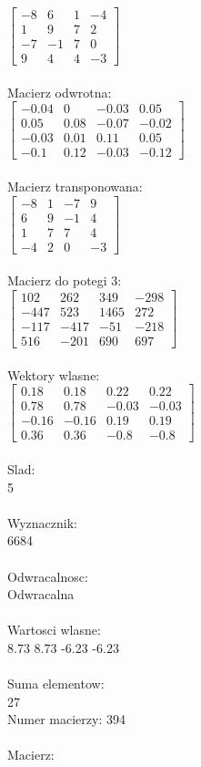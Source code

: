 \documentclass[a4paper,12pt]{article}
\begin{document}
$\begin{bmatrix} -8&6&1&-4\\1&9&7&2\\-7&-1&7&0\\9&4&4&-3 \end{bmatrix}$
\\
\\
Macierz odwrotna:\\

$\begin{bmatrix} -0.04&0&-0.03&0.05\\0.05&0.08&-0.07&-0.02\\-0.03&0.01&0.11&0.05\\-0.1&0.12&-0.03&-0.12 \end{bmatrix}$
\\
\\
Macierz transponowana:\\

$\begin{bmatrix} -8&1&-7&9\\6&9&-1&4\\1&7&7&4\\-4&2&0&-3 \end{bmatrix}$
\\
\\
Macierz do potegi 3:\\

$\begin{bmatrix} 102&262&349&-298\\-447&523&1465&272\\-117&-417&-51&-218\\516&-201&690&697 \end{bmatrix}$
\\
\\
Wektory wlasne:\\

$\begin{bmatrix} 0.18&0.18&0.22&0.22\\0.78&0.78&-0.03&-0.03\\-0.16&-0.16&0.19&0.19\\0.36&0.36&-0.8&-0.8 \end{bmatrix}$
\\
\\
Slad:\\
5
\\
\\
Wyznacznik:\\
6684
\\
\\
Odwracalnosc:\\
Odwracalna
\\
\\
Wartosci wlasne:\\
8.73 8.73 -6.23 -6.23
\\
\\
Suma elementow:\\
27
\\
\newpage
Numer macierzy:
394
\\
\\
Macierz:\\
\end{document}
